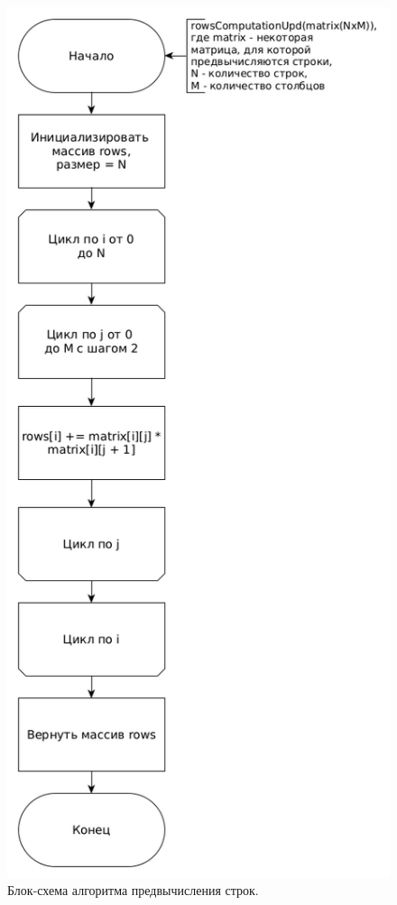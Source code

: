 \documentclass[12pt]{report}
\begin{document}
\begin{figure}
\begin{center}
\includegraphics[scale=0.33]{inc/img/rowsCompUpd.png}
\captionsetup{justification=centering}
	\caption{Блок-схема алгоритма предвычисления строк.}
	\label{img:rowsUpd}	
\end{center}
\end{figure}
\end{document}
